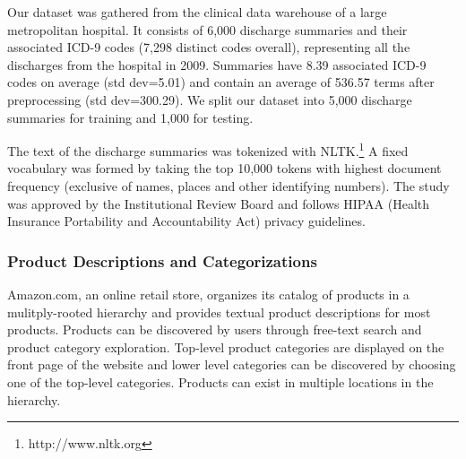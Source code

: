 
Our dataset was gathered from the clinical data warehouse of
a large metropolitan hospital. It consists of 6,000 discharge summaries and
their associated ICD-9 codes (7,298 distinct codes overall), representing all
the discharges from the hospital in 2009. Summaries have 8.39 associated ICD-9
codes on average (std dev=5.01) and contain an average of 536.57 terms after
preprocessing (std dev=300.29). We split our dataset into 5,000 discharge
summaries for training and 1,000 for testing.

The text of the discharge summaries was tokenized with
NLTK.\footnote{http://www.nltk.org} A fixed vocabulary was formed by taking
the top 10,000 tokens with highest document frequency (exclusive of names,
places and other identifying numbers). The study was approved
by the Institutional Review Board and follows HIPAA (Health
Insurance Portability and Accountability Act) privacy guidelines.


\subsubsection{Product Descriptions and Categorizations}

Amazon.com, an online retail store, organizes its catalog of 
products in a mulitply-rooted hierarchy and provides textual product descriptions
for most products.  Products can be discovered by users
through free-text search and product category exploration. Top-level
product categories are displayed on the front page of the website and lower
level categories can be discovered by choosing one of the top-level categories.
Products can exist in multiple locations in the hierarchy.

